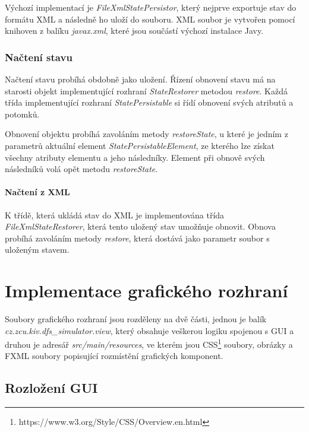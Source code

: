 \documentclass[czech,DP]{thesiskiv}
\begin{document}
Výchozí implementací je \textit{FileXmlStatePersistor}, který nejprve exportuje stav do formátu XML a následně ho uloží do souboru. XML soubor je vytvořen pomocí knihoven z balíku \textit{javax.xml}, které jsou součástí výchozí instalace Javy.

\subsection{Načtení stavu}

Načtení stavu probíhá obdobně jako uložení. Řízení obnovení stavu má na starosti objekt implementující rozhraní \textit{StateRestorer} metodou \textit{restore}. Každá třída implementující rozhraní \textit{StatePersistable} si řídí obnovení svých atributů a potomků. 

Obnovení objektu probíhá zavoláním metody \textit{restoreState}, u které je jedním z parametrů aktuální element \textit{StatePersistableElement}, ze kterého lze získat všechny atributy elementu a jeho následníky. Element při obnově svých následníků volá opět metodu \textit{restoreState}.

\subsubsection*{Načtení z XML}

K třídě, která ukládá stav do XML je implementována třída \textit{FileXmlStateRestorer}, která tento uložený stav umožňuje obnovit. Obnova probíhá zavoláním metody \textit{restore}, která dostává jako parametr soubor s uloženým stavem.

\chapter{Implementace grafického rozhraní}

Soubory grafického rozhraní jsou rozděleny na dvě části, jednou je balík \textit{cz.zcu.kiv.dfs\_simulator.view}, který obsahuje veškerou logiku spojenou s GUI a druhou je adresář \textit{src/main/resources}, ve kterém jsou CSS\footnote{https://www.w3.org/Style/CSS/Overview.en.html} soubory, obrázky a FXML soubory popisující rozmístění grafických komponent.

\section{Rozložení GUI}
\end{document}
